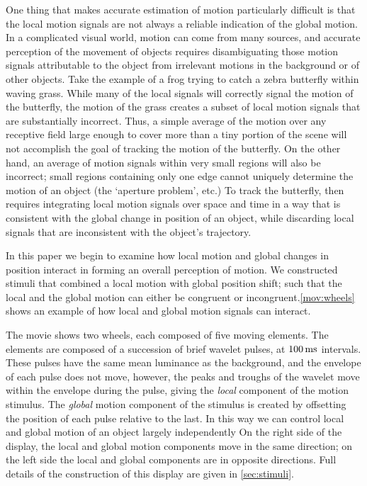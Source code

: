 \documentclass[manuscript]{subfiles}
\begin{document}
One thing that makes accurate estimation of motion particularly difficult is that the local motion signals are not always a reliable indication of the global motion. In a complicated visual world, motion can come from many sources, and accurate perception of the movement of objects requires disambiguating those motion signals attributable to the object from irrelevant motions in the background or of other objects. Take the example of a frog trying to catch a zebra butterfly within waving grass. While many of the local signals will correctly signal the motion of the butterfly, the motion of the grass creates a subset of local motion signals that are substantially incorrect. Thus, a simple average of the motion over any receptive field large enough to cover more than a tiny portion of the scene will not accomplish the goal of tracking the motion of the butterfly. On the other hand, an average of motion signals within very small regions will also be incorrect; small regions containing only one edge cannot uniquely determine the motion of an object (the `aperture problem', etc.) To track the butterfly, then requires integrating local motion signals over space and time in a way that is consistent with the global change in position of an object, while discarding local signals that are inconsistent with the object's trajectory.

In this paper we begin to examine how local motion and global changes in position interact in forming an overall perception of motion. We constructed stimuli that combined a local motion with global position shift; such that the local and the global motion can either be congruent or incongruent.\autoref{mov:wheels} shows an example of how local and global motion signals can interact. 

The movie shows two wheels, each composed of five moving elements. The elements are composed of a succession of brief wavelet pulses, at $\unit[100]{ms}$ intervals. These pulses have the same mean luminance as the background, and the envelope of each pulse does not move, however, the peaks and troughs of the wavelet move within the envelope during the pulse, giving the \emph{local} component of the motion stimulus. The \emph{global} motion component of the stimulus is created by offsetting the position of each pulse relative to the last. In this way we can control local and global motion of an object largely independently On the right side of the display, the local and global motion components move in the same direction; on the left side the local and global components are in opposite directions. Full details of the construction of this display are given in \autoref{sec:stimuli}.
\end{document}
